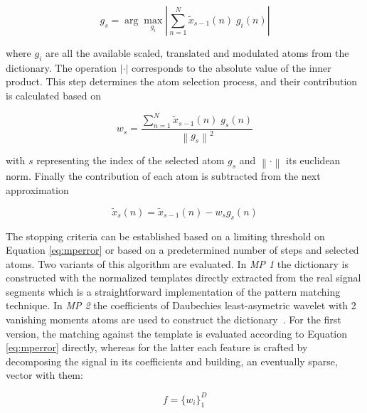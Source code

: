 \begin{equation}
g_{s} = \arg \max_{g_{i}} \left\lvert  \sum_{n=1}^{N} \tilde{x}_{s-1}(n) \; g_{i}(n) \right\rvert 
\label{eq:mp3}
\end{equation}

\noindent where $g_{i}$ are all the available scaled, translated and modulated atoms from the dictionary.  The operation $\left\lvert \cdot \right\rvert$ corresponds to the absolute value of the inner product.  This step determines the atom selection process, and their contribution is calculated based on 



\begin{equation}
w_{s} =  \frac{\sum_{n=1}^{N} \tilde{x}_{s-1}(n) \; g_{s}(n)}{  {\left\lVert  g_{s} \right\rVert}^{2} }
\label{eq:mp4}
\end{equation}

\noindent with $s$ representing the index of the selected atom $g_{s}$ and $\left\lVert \cdot \right\rVert$ its euclidean norm.  Finally the contribution of each atom is subtracted from the next approximation~\cite{Cohen2014,Sanei2007, Mallat1993}

\begin{equation}
\tilde{x}_{s}(n)=  \tilde{x}_{s-1}(n) - w_{s} g_{s} (n)
\label{eq:mp5}
\end{equation}

The stopping criteria can be established based on a limiting threshold on Equation \ref{eq:mperror} or based on a predetermined number of steps and selected atoms.  Two variants of this algorithm are evaluated. In \textit{MP 1} the dictionary is constructed with the normalized templates directly extracted from the real signal segments which is a straightforward implementation of the pattern matching technique.  In \textit{MP 2} the coefficients of Daubechies least-asymetric wavelet with 2 vanishing moments atoms are used to construct the dictionary~\cite{Vareka2012}.  For the first version, the matching against the template is evaluated according to Equation \ref{eq:mperror} directly, whereas for the latter each feature is crafted by decomposing the signal in its coefficients and building, an eventually sparse, vector with them:

\begin{equation}
f =  {\bigg \{ w_{i} \bigg \}}_{1}^{D} 
\label{eq:mp6}
\end{equation}

